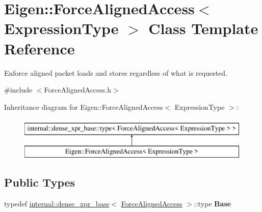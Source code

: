 \hypertarget{class_eigen_1_1_force_aligned_access}{}\section{Eigen\+::Force\+Aligned\+Access$<$ Expression\+Type $>$ Class Template Reference}
\label{class_eigen_1_1_force_aligned_access}


Enforce aligned packet loads and stores regardless of what is requested.  




{\ttfamily \#include $<$Force\+Aligned\+Access.\+h$>$}

Inheritance diagram for Eigen\+::Force\+Aligned\+Access$<$ Expression\+Type $>$\+:\begin{figure}[H]
\begin{center}
\leavevmode
\includegraphics[height=2.000000cm]{class_eigen_1_1_force_aligned_access}
\end{center}
\end{figure}
\subsection*{Public Types}
\begin{DoxyCompactItemize}
\item 
\mbox{\label{class_eigen_1_1_force_aligned_access_ab13595a959d9a280955904706f055e47}} 
typedef \mbox{\hyperlink{struct_eigen_1_1internal_1_1dense__xpr__base}{internal\+::dense\+\_\+xpr\+\_\+base}}$<$ \mbox{\hyperlink{class_eigen_1_1_force_aligned_access}{Force\+Aligned\+Access}} $>$\+::type {\bfseries Base}
\end{DoxyCompactItemize}

